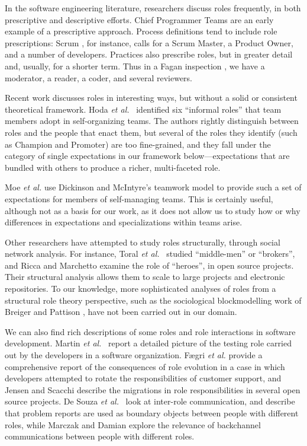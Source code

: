 \documentclass[10pt, conference, compsocconf]{IEEEtran}
\begin{document}
In the software engineering literature, researchers discuss roles frequently, in both prescriptive and descriptive efforts. Chief Programmer Teams \cite{Baker1972} are an early example of a prescriptive approach. Process definitions tend to include role prescriptions: Scrum \cite{Schwaber2001}, for instance, calls for a Scrum Master, a Product Owner, and a number of developers. Practices also prescribe roles, but in greater detail and, usually, for a shorter term. Thus in a Fagan inspection \cite{Fagan1976}, we have a moderator, a reader, a coder, and several reviewers.

Recent work discusses roles in interesting ways, but without a solid or consistent theoretical framework. Hoda \emph{et al.}\ \cite{Hoda2010} identified six ``informal roles'' that team members adopt in self-organizing teams. The authors rightly distinguish between roles and the people that enact them, but several of the roles they identify (such as Champion and Promoter) are too fine-grained, and they fall under the category of single expectations in our framework below---expectations that are bundled with others to produce a richer, multi-faceted role.

Moe \emph{et al.} \cite{Moe2010} use Dickinson and McIntyre's \cite{Dickinson1997} teamwork model to provide such a set of expectations for members of self-managing teams. This is certainly useful, although not as a basis for our work, as it does not allow us to study how or why differences in expectations and specializations within teams arise.

Other researchers have attempted to study roles structurally, through social network analysis. For instance, Toral \emph{et al.}\ \cite{Toral2010} studied ``middle-men'' or ``brokers'', and Ricca and Marchetto \cite{Ricca2010} examine the role of ``heroes'', in open source projects. Their structural analysis allows them to scale to large projects and electronic repositories. To our knowledge, more sophisticated analyses of roles from a structural role theory perspective, such as the sociological blockmodelling work of Breiger and Pattison \cite{Breiger1986}, have not been carried out in our domain.

We can also find rich descriptions of some roles and role interactions in software development. Martin \emph{et al.}\ \cite{Martin2007} report a detailed picture of the testing role carried out by the developers in a software organization. F{\ae}gri \emph{et al.} \cite{Faegri2010} provide a comprehensive report of the consequences of role evolution in a case in which developers attempted to rotate the responsibilities of customer support, and Jensen and Scacchi \cite{Jensen2007} describe the migrations in role responsibilities in several open source projects. De Souza \emph{et al.}\ \cite{deSouza2003} look at inter-role communication, and describe that problem reports are used as boundary objects \cite{Bowker1999} between people with different roles, while Marczak and Damian \cite{Marczak2011} explore the relevance of backchannel communications between people with different roles.
\end{document}
